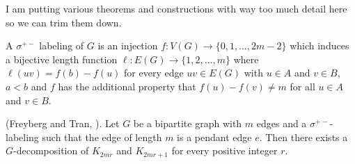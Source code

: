 I am putting various theorems and constructions with way too much detail here so we can trim them down.
\begin{definition}\label{sigmapm}
  \cite{FreyTran} A $\sigma^{+-}$ labeling of $G$ is an injection $f:V(G) \rightarrow \{0,1,\hdots, 2m-2\}$ which induces a bijective length function $\ell:E(G)\rightarrow \{1, 2,\hdots, m\}$ where $\ell(uv) = f(b)-f(u)$ for every edge $uv\in E(G)$ with $u\in A$ and $v\in B$, $a<b$ and $f$ has the additional property that $f(u)-f(v) \neq m$ for all $u\in A$ and $v\in B$.
\end{definition}

\begin{thm}\label{sigmadesign}
  (Freyberg and Tran, \cite{FreyTran}). Let $G$ be a bipartite graph with $m$ edges and a $\sigma^{+-}$-labeling such that the edge of length $m$ is a pendant edge $e$. Then there exists a $G$-decomposition of $K_{2mr}$ and $K_{2mr+1}$ for every positive integer $r$.
\end{thm}

